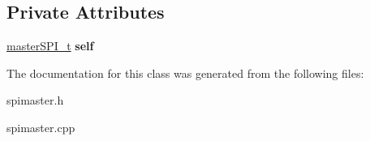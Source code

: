 \subsection*{Private Attributes}
\begin{DoxyCompactItemize}
\item 
\mbox{\label{classMasterSPI_ad92299e347f8e51309afc226daff5677}} 
\hyperlink{structmasterSPI__t}{master\+S\+P\+I\+\_\+t} {\bfseries self}
\end{DoxyCompactItemize}


The documentation for this class was generated from the following files\+:\begin{DoxyCompactItemize}
\item 
spimaster.\+h\item 
spimaster.\+cpp\end{DoxyCompactItemize}
